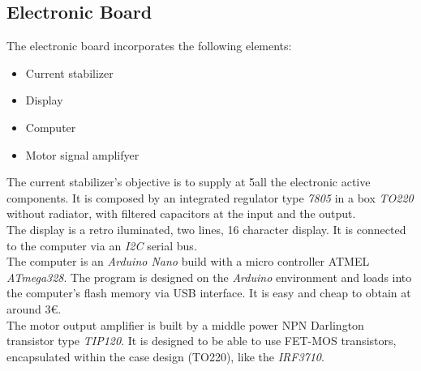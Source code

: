 \subsection{Electronic Board}
    The electronic board incorporates the following elements:
    \begin{itemize}
        \item Current stabilizer  %
        \item Display %
        \item Computer %
        \item Motor signal amplifyer  %
    \end{itemize}
    The current stabilizer's objective is to supply at 5\Vcc all the electronic active components. It is composed by an integrated regulator type \textit{7805} in a box \textit{TO220} without radiator, with filtered capacitors at the input and the output.\\

    The display is a retro iluminated, two lines, 16 character display. It is connected to the computer via an \textit{I2C} serial bus.\\
    
    The computer is an \textit{Arduino Nano} build with a micro controller ATMEL \textit{ATmega328}. The program is designed on the \textit{Arduino} environment and loads into the computer's flash memory via USB interface. It is easy and cheap to obtain at around 3€.\\
    
    The motor output amplifier is built by a middle power NPN Darlington transistor type \textit{TIP120}. It is designed to be able to use FET-MOS transistors, encapsulated within the case design (TO220), like the \textit{IRF3710}.\\
    
